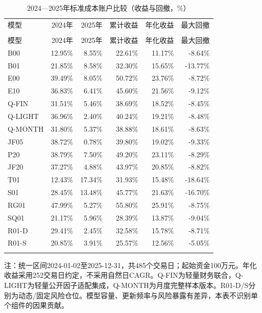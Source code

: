 \documentclass[12pt]{article}
\newcommand{\toprule}{\noalign{\hrule height .8pt}}
\newcommand{\midrule}{\noalign{\hrule height .4pt}}
\newcommand{\bottomrule}{\noalign{\hrule height .8pt}}
\begin{document}
{\small
\begin{longtable}{@{}lrrrrr@{}}
\caption{2024—2025年标准成本账户比较（收益与回撤，\%）}\label{tab:history}\\
\toprule
模型 & 2024年 & 2025年 & 累计收益 & 年化收益 & 最大回撤 \\
\midrule\endfirsthead
\multicolumn{6}{c}{表\thetable（续）}\\\toprule
模型 & 2024年 & 2025年 & 累计收益 & 年化收益 & 最大回撤 \\
\midrule\endhead
B00 & 12.95\% & 8.55\% & 22.61\% & 11.17\% & -8.64\% \\
B01 & 21.85\% & 8.58\% & 32.30\% & 15.65\% & -13.77\% \\
E00 & 39.49\% & 8.05\% & 50.72\% & 23.76\% & -8.72\% \\
E10 & 36.83\% & 6.41\% & 45.60\% & 21.56\% & -9.12\% \\
Q-FIN & 31.51\% & 5.46\% & 38.69\% & 18.52\% & -8.45\% \\
Q-LIGHT & 36.96\% & 2.40\% & 40.24\% & 19.21\% & -8.48\% \\
Q-MONTH & 31.80\% & 5.37\% & 38.88\% & 18.61\% & -8.63\% \\
JF05 & 38.72\% & 0.78\% & 39.80\% & 19.02\% & -9.33\% \\
P20 & 38.79\% & 7.50\% & 49.20\% & 23.11\% & -8.29\% \\
JF20 & 37.27\% & 4.88\% & 43.97\% & 20.85\% & -8.82\% \\
T01 & 12.43\% & 17.34\% & 31.93\% & 15.48\% & -18.64\% \\
S01 & 28.45\% & 13.48\% & 45.77\% & 21.63\% & -16.70\% \\
RG01 & 47.99\% & 5.27\% & 55.80\% & 25.91\% & -8.75\% \\
SQ01 & 21.17\% & 5.96\% & 28.39\% & 13.87\% & -9.04\% \\
R01-D & 29.41\% & 2.45\% & 32.58\% & 15.78\% & -8.71\% \\
R01-S & 20.85\% & 3.91\% & 25.57\% & 12.56\% & -5.05\% \\
\bottomrule\end{longtable}}
{\footnotesize\noindent 注：统一区间2024-01-02至2025-12-31，共485个交易日；起始资金100万元。年化收益采用252交易日约定，不采用自然日CAGR。Q-FIN为轻量财务联合，Q-LIGHT为轻量公开因子适配集成，Q-MONTH为月度完整样本版本。R01-D/S分别为动态/固定风险仓位。模型容量、更新频率与风险暴露有差异，本表不识别单个组件的因果贡献。\par}
\end{document}
